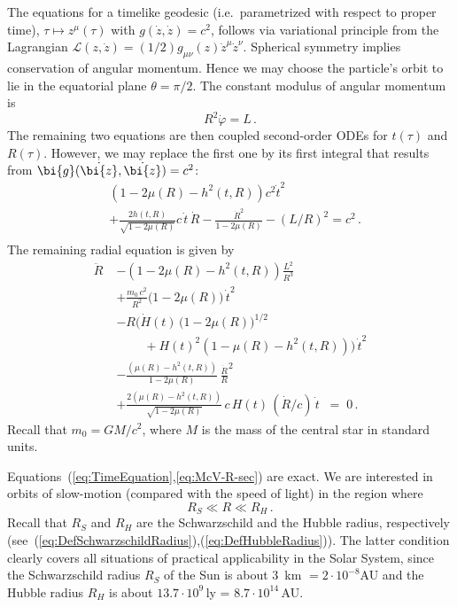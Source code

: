 \documentclass
[rmp,aps,twocolumn,showpacs,preprintnumbers,amsmath,amssymb]{revtex4}
\theoremstyle{plain}
\theoremstyle{definition}
\theoremstyle{remark}
\newcommand{\g}{\bg}                            %
\newcommand{\bg}{\bi{g}}
\newcommand{\bz}{\bi{z}}
\begin{document}
The equations for a timelike geodesic (i.e.~parametrized with respect 
to proper time), $\tau \mapsto z^\mu(\tau)$ with $g(\dot z,\dot z)=c^2$, 
follows via variational principle from the Lagrangian 
$\mathcal{L}(z,\dot z)=(1/2)g_{\mu\nu}(z){\dot z^\mu}{\dot z^\nu}$.
Spherical symmetry implies conservation of angular momentum. 
Hence we may choose the particle's orbit to lie in the 
equatorial plane $\theta=\pi/2$. The constant modulus of angular 
momentum is  
%
\begin{equation}\label{eq:ConsAngMom}
  R^2\dot{\varphi} = L \,.
\end{equation}
%
The remaining two equations are then coupled second-order ODEs for 
$t(\tau)$ and $R(\tau)$. However, we may replace the first one by its 
first integral that results from $\g(\dot \bz,\dot \bz)=c^2$: 
%
\begin{equation}\label{eq:TimeEquation}
\begin{split}
  &\left( 1 - 2\mu(R) - h^2(t,R) \right)c^2 \dot t^2\\
  &+\frac{2h(t,R)}{\sqrt{1-2\mu(R)}} c\,\dot t\,\dot R
   -\frac{\dot R^2}{1-2\mu(R)}
   - (L/R)^2 =c^2\,.\\
\end{split}
\end{equation}
%
The remaining radial equation is given by 
%
\begin{equation}\label{eq:McV-R-sec}
\begin{split}
\ddot{R} \;
&-\left( 1-2\mu(R)-h^2(t,R) \right)\frac{L^2}{R^3}
\\
&+\frac{m_0\,c^2}{R^2}\big( 1-2\mu(R) \big)\,\dot{t}^2
\\
&-R\Big( \dot{H}(t)\,\big(1-2\mu(R)\big)^{1/2}%
\\
&\phantom{-R\Big(}\;+H(t)^2\left( 1-\mu(R)-h^2(t,R) \right)
    \Big)\,\dot{t}^2
\\
&-\frac{\left( \mu(R)-h^2(t,R) \right)}
  {1-2\mu(R)}\,\frac{\dot R}{R}^2
\\
&+\frac{2\left( \mu(R)- h^2(t,R) \right)}
   {\sqrt{1-2\mu(R)}}\, c\,H(t)\,(\dot{R}/c)\,\dot{t} \;\; = \; 0 \,.
\end{split}
\end{equation}
%
Recall that $m_0=GM/c^2$, where $M$ is the mass of the central star in 
standard units.

Equations~(\ref{eq:TimeEquation},\ref{eq:McV-R-sec}) are exact.
We are interested in orbits of slow-motion (compared with the speed 
of light) in the region where
%
\begin{equation}\label{eq:R-region}
  R_S \ll R \ll R_H \,.
\end{equation}
%
Recall that $R_S$ and $R_H$ are the Schwarzschild and the Hubble 
radius, respectively 
(see~(\ref{eq:DefSchwarzschildRadius}),(\ref{eq:DefHubbleRadius})). 
The latter condition clearly covers all situations of practical 
applicability in the Solar System, since the Schwarzschild radius 
$R_S$ of the Sun is about 3~km $=2\cdot 10^{-8}$AU and the Hubble 
radius $R_H$ is about $13.7\cdot 10^{9}$\,ly = $8.7\cdot 10^{14}$\,AU.
\end{document}

